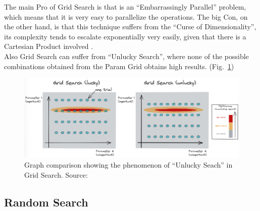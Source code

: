 The main Pro of Grid Search is that is an “Embarrassingly Parallel” problem, which means that it is very easy to parallelize the operations.
The big Con, on the other hand, is that this technique suffers from the “Curse of Dimensionality”, its complexity tends to escalate exponentially very easily, given that there is a Cartesian Product involved \cite{Tesi-1.10}.
\\[0.3cm]Also Grid Search can suffer from “Unlucky Search”, where none of the possible combinations obtained from the Param Grid obtains high results. (Fig.~\ref{fig:figure-2.2.3})
\begin{figure}[t]
	\centering
	\includegraphics[width=15cm]{figures/figure-2.2.3.png}
	\caption[Unlucky Search]{Graph comparison showing the phenomenon of “Unlucky Seach” in Grid Search. Source:~\cite{Tesi-1.3}}
	\label{fig:figure-2.2.3}
\end{figure}

\subsection{Random Search}

